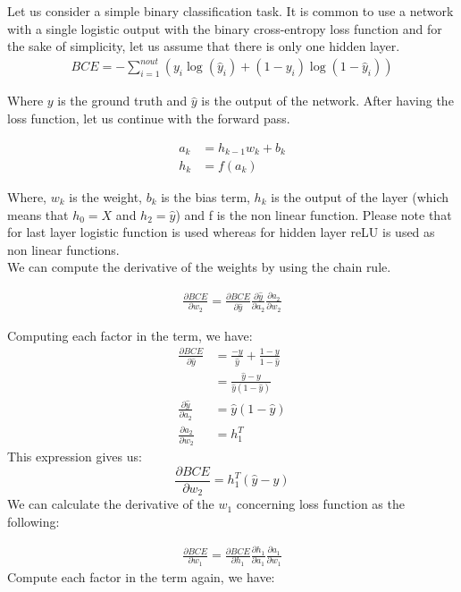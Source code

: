 \documentclass[a4paper, nobind]{templates/ociamthesis}
\begin{document}
Let us consider a simple binary classification task. It is common to use a network with a single logistic output with the binary cross-entropy loss function and for the sake of simplicity, let us assume that there is only one hidden layer.
\[
\begin{aligned}
BCE=-\sum_{i=1}^{n o u t}\left(y_i \log \left(\hat{y}_i \right)+\left(1-y_i\right) \log \left(1-\hat{y}_i\right)\right)
\end{aligned}
\]

Where \(y\) is the ground truth and \(\hat{y}\) is the output of the network. After having the loss function, let us continue with the forward pass.

\[
\begin{aligned} 
a_{k} &= h_{k-1} w_{k} + b_k \\
h_k &= f(a_{k})
\end{aligned}
\]

Where, \(w_k\) is the weight, \(b_{k}\) is the bias term, \(h_k\) is the output of the layer (which means that \(h_0 = X\) and \(h_2 = \hat{y}\)) and f is the non linear function. Please note that for last layer logistic function is used whereas for hidden layer reLU is used as non linear functions.\\
We can compute the derivative of the weights by using the chain rule.

\[
\begin{aligned} 
\frac{\partial BCE}{\partial w_{2}}=\frac{\partial BCE}{\partial \hat{y}} \frac{\partial \hat{y}}{\partial a_{2}} \frac{\partial a_{2}}{\partial w_{2}}
\end{aligned}
\]

Computing each factor in the term, we have:
\[
\begin{aligned}
\frac{\partial BCE}{\partial \hat{y}} &=\frac{-y}{\hat{y}}+\frac{1-y}{1-\hat{y}} \\
&=\frac{\hat{y}-y}{\hat{y}\left(1-\hat{y}\right)} \\
\frac{\partial \hat{y}}{\partial a_{2}} &=\hat{y}\left(1-\hat{y}\right) \\
\frac{\partial a_{2}}{\partial w_{2}} &=h_{1}^T
\end{aligned}
\]
This expression gives us:
\[
\frac{\partial BCE}{\partial w_{2}}=h_{1}^T\left(\hat{y}-y\right)
\]
We can calculate the derivative of the \(w_1\) concerning loss function as the following:

\[
\begin{aligned} 
\frac{\partial BCE}{\partial w_{1}}=\frac{\partial BCE}{\partial h_1} \frac{\partial h_1}{\partial a_{1}} \frac{\partial a_{1}}{\partial w_{1}}
\end{aligned}
\]
Compute each factor in the term again, we have:
\end{document}
